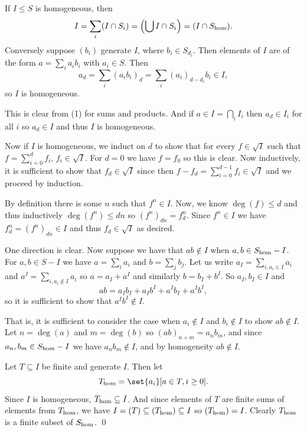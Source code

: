 \elemm

\bproof

    \benum
        \item If $I\leq S$ is homogeneous, then
        $$ I = \sum_i(I\cap S_i) = \mathopen{}\mathclose{\left(\bigcup I\cap S_i\right)} = (I\cap S_{\rm hom}) . $$
        Conversely suppose $(b_i)$ generate $I$, where $b_i\in S_{d_i}$.
        Then elements of $I$ are of the form $a=\sum_ia_ib_i$ with $a_i\in S$.
        Then
        $$ a_d = \sum_i(a_ib_i)_d = \sum_i(a_i)_{d-d_i}b_i \in I , $$
        so $I$ is homogeneous.

        \item This is clear from (1) for sums and products.
        And if $a\in I=\bigcap_iI_i$ then $a_d\in I_i$ for all $i$ so $a_d\in I$ and thus $I$ is homogeneous.

        Now if $I$ is homogeneous, we induct on $d$ to show that for every $f\in\sqrt I$ such that $f=\sum_{i=0}^df_i$, $f_i\in\sqrt I$.
        For $d=0$ we have $f=f_0$ so this is clear.
        Now inductively, it is sufficient to show that $f_d\in\sqrt I$ since then $f-f_d=\sum_{i=0}^{d-1}f_i\in\sqrt I$ and we proceed by induction.

        By definition there is some $n$ such that $f^n\in I$.
        Now, we know $\deg(f)\leq d$ and thus inductively $\deg(f^n)\leq dn$ so $(f^n)_{dn}=f_d^n$.
        Since $f^n\in I$ we have $f_d^n=(f^n)_{dn}\in I$ and thus $f_d\in\sqrt I$ as desired.

        \item One direction is clear.
        Now suppose we have that $ab\notin I$ when $a,b\in S_{\rm hom}-I$.
        For $a,b\in S-I$ we have $a=\sum_ia_i$ and $b=\sum_jb_j$.
        Let us write $a_I=\sum_{i,a_i\in I}a_i$ and $a^I=\sum_{i,a_i\notin I}a_i$ so $a=a_I+a^I$ and similarly $b=b_I+b^I$.
        So $a_I,b_I\in I$ and
        $$ ab = a_Ib_I + a_Ib^I + a^Ib_I + a^Ib^I , $$
        so it is sufficient to show that $a^Ib^I\notin I$.

        That is, it is sufficient to consider the case when $a_i\notin I$ and $b_i\notin I$ to show $ab\notin I$.
        Let $n=\deg(a)$ and $m=\deg(b)$ so $(ab)_{n+m}=a_nb_m$, and since $a_n,b_m\in S_{\rm hom}-I$ we have $a_nb_m\notin I$, and by homogeneity $ab\notin I$.

        \item Let $T\subseteq I$ be finite and generate $I$.
        Then let
        $$ T_\homo = \set{a_i}[a\in T,i\geq0] . $$
        Since $I$ is homogeneous, $T_{\rm hom}\subseteq I$.
        And since elements of $T$ are finite sums of elements from $T_{\rm hom}$, we have $I=(T)\subseteq(T_{\rm hom})\subseteq I$ so $(T_{\rm hom})=I$.
        Clearly $T_{\rm hom}$ is a finite subset of $S_{\rm hom}$.
        \qed
    \eenum


